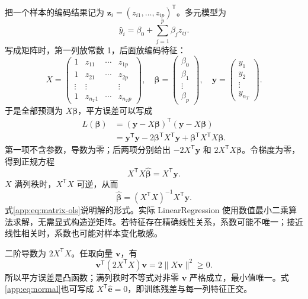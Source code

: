 把一个样本的编码结果记为 $\mathbf z_i=(z_{i1},\ldots,z_{ip})^{\mathsf T}$。多元模型为
\begin{equation}
\hat y_i=\beta_0+\sum_{j=1}^{p}\beta_jz_{ij}.
\end{equation}
写成矩阵时，第一列放常数 1，后面放编码特征：
\[
X=\begin{pmatrix}
1&z_{11}&\cdots&z_{1p}\\
1&z_{21}&\cdots&z_{2p}\\
\vdots&\vdots&&\vdots\\
1&z_{n_T1}&\cdots&z_{n_Tp}
\end{pmatrix},\quad
\boldsymbol\beta=\begin{pmatrix}\beta_0\\\beta_1\\\vdots\\\beta_p\end{pmatrix},\quad
\mathbf y=\begin{pmatrix}y_1\\y_2\\\vdots\\y_{n_T}\end{pmatrix}.
\]
于是全部预测为 $X\boldsymbol\beta$，平方误差可以写成
\begin{align}
L(\boldsymbol\beta)
&=(\mathbf y-X\boldsymbol\beta)^{\mathsf T}(\mathbf y-X\boldsymbol\beta)\\
&=\mathbf y^{\mathsf T}\mathbf y
-2\boldsymbol\beta^{\mathsf T}X^{\mathsf T}\mathbf y
+\boldsymbol\beta^{\mathsf T}X^{\mathsf T}X\boldsymbol\beta.
\end{align}
第一项不含参数，导数为零；后两项分别给出 $-2X^{\mathsf T}\mathbf y$ 和 $2X^{\mathsf T}X\boldsymbol\beta$。令梯度为零，得到正规方程
\begin{equation}\label{app:eq:normal}
X^{\mathsf T}X\hat{\boldsymbol\beta}=X^{\mathsf T}\mathbf y.
\end{equation}
$X$ 满列秩时，$X^{\mathsf T}X$ 可逆，从而
\begin{equation}\label{app:eq:matrix-ols}
\hat{\boldsymbol\beta}=(X^{\mathsf T}X)^{-1}X^{\mathsf T}\mathbf y.
\end{equation}
式\eqref{app:eq:matrix-ols}说明解的形式。实际 LinearRegression 使用数值最小二乘算法求解，无需显式构造逆矩阵\citep{sklearn}。若特征存在精确线性关系，系数可能不唯一；接近线性相关时，系数也可能对样本变化敏感。

二阶导数为 $2X^{\mathsf T}X$。任取向量 $\mathbf v$，有
\[
\mathbf v^{\mathsf T}(2X^{\mathsf T}X)\mathbf v=2\|X\mathbf v\|^2\geq0.
\]
所以平方误差是凸函数；满列秩时不等式对非零 $\mathbf v$ 严格成立，最小值唯一。式\eqref{app:eq:normal}也可写成 $X^{\mathsf T}\hat{\mathbf e}=0$，即训练残差与每一列特征正交。

